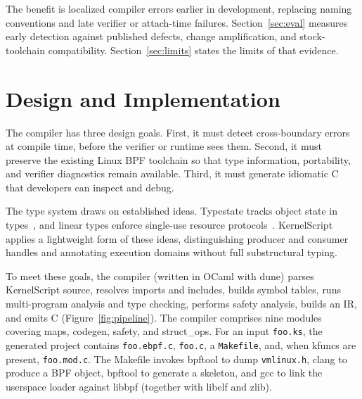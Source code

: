 \documentclass[sigplan,10pt,nonacm]{acmart}
\newcommand{\tool}{KernelScript}
\begin{document}
The benefit is localized compiler errors earlier in development, replacing naming conventions and late verifier or attach-time failures.
Section~\ref{sec:eval} measures early detection against published defects, change amplification, and stock-toolchain compatibility. Section~\ref{sec:limits} states the limits of that evidence.

\section{Design and Implementation}
\label{sec:impl}

The compiler has three design goals.
First, it must detect cross-boundary errors at compile time, before the verifier or runtime sees them.
Second, it must preserve the existing Linux BPF toolchain so that type information, portability, and verifier diagnostics remain available.
Third, it must generate idiomatic C that developers can inspect and debug.

The type system draws on established ideas.
Typestate tracks object state in types~\cite{typestate}, and linear types enforce single-use resource protocols~\cite{lineartypes,vault,sessiontypes}.
\tool{} applies a lightweight form of these ideas, distinguishing producer and consumer handles and annotating execution domains without full substructural typing.

To meet these goals, the compiler (written in OCaml with dune) parses \tool{} source, resolves imports and includes, builds symbol tables, runs multi-program analysis and type checking, performs safety analysis, builds an IR, and emits C (Figure~\ref{fig:pipeline}).
The compiler comprises nine modules covering maps, codegen, safety, and struct\_ops.
For an input \texttt{foo.ks}, the generated project contains \texttt{foo.ebpf.c}, \texttt{foo.c}, a \texttt{Makefile}, and, when kfuncs are present, \texttt{foo.mod.c}.
The Makefile invokes bpftool to dump \texttt{vmlinux.h}, clang to produce a BPF object, bpftool to generate a skeleton, and gcc to link the userspace loader against libbpf (together with libelf and zlib).
\end{document}
